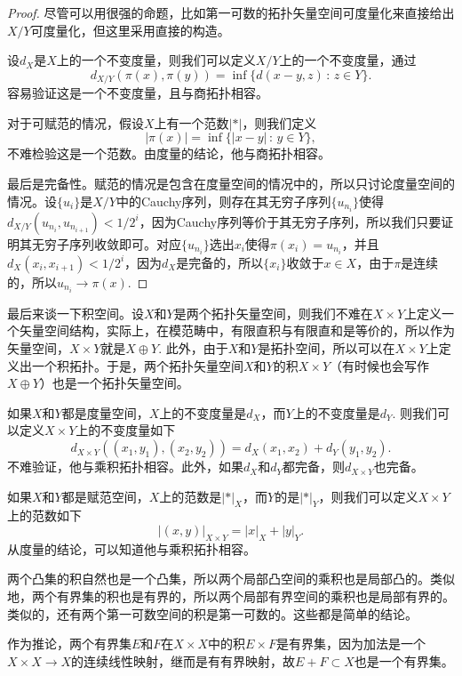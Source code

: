 \begin{proof}
	尽管可以用很强的命题，比如第一可数的拓扑矢量空间可度量化来直接给出$X/Y$可度量化，但这里采用直接的构造。

	设$d_X$是$X$上的一个不变度量，则我们可以定义$X/Y$上的一个不变度量，通过
	\[
	d_{X/Y}(\pi(x),\pi(y))=\inf\{d(x-y,z)\,:\, z\in Y\}.
	\]
	容易验证这是一个不变度量，且与商拓扑相容。

	对于可赋范的情况，假设$X$上有一个范数$|*|$，则我们定义
	\[
	|\pi(x)|=\inf\{|x-y|\,:\,y\in Y\},
	\]
	不难检验这是一个范数。由度量的结论，他与商拓扑相容。

	最后是完备性。赋范的情况是包含在度量空间的情况中的，所以只讨论度量空间的情况。设$\{u_i\}$是$X/Y$中的Cauchy序列，则存在其无穷子序列$\{u_{n_i}\}$使得$d_{X/Y}(u_{n_i},u_{n_{i+1}})<1/2^i$，因为Cauchy序列等价于其无穷子序列，所以我们只要证明其无穷子序列收敛即可。对应$\{u_{n_i}\}$选出$x_i$使得$\pi(x_i)=u_{n_i}$，并且$d_X(x_i,x_{i+1})<1/2^i$，因为$d_X$是完备的，所以$\{x_i\}$收敛于$x\in X$，由于$\pi$是连续的，所以$u_{n_i}\to \pi(x)$.
\end{proof}

\begin{para}
	最后来谈一下积空间。设$X$和$Y$是两个拓扑矢量空间，则我们不难在$X\times Y$上定义一个矢量空间结构，实际上，在模范畴中，有限直积与有限直和是等价的，所以作为矢量空间，$X\times Y$就是$X\oplus Y$. 此外，由于$X$和$Y$是拓扑空间，所以可以在$X\times Y$上定义出一个积拓扑。于是，两个拓扑矢量空间$X$和$Y$的积$X\times Y$（有时候也会写作$X\oplus Y$）也是一个拓扑矢量空间。

	如果$X$和$Y$都是度量空间，$X$上的不变度量是$d_X$，而$Y$上的不变度量是$d_Y$. 则我们可以定义$X\times Y$上的不变度量如下
	\[
	d_{X\times Y}\left((x_1,y_1),(x_2,y_2)\right)=d_X(x_1,x_2)+d_Y(y_1,y_2).
	\]
	不难验证，他与乘积拓扑相容。此外，如果$d_X$和$d_Y$都完备，则$d_{X\times Y}$也完备。

	如果$X$和$Y$都是赋范空间，$X$上的范数是$|*|_X$，而$Y$的是$|*|_Y$，则我们可以定义$X\times Y$上的范数如下
	\[
	|(x,y)|_{X\times Y}=|x|_X+|y|_Y.
	\]
	从度量的结论，可以知道他与乘积拓扑相容。

	两个凸集的积自然也是一个凸集，所以两个局部凸空间的乘积也是局部凸的。类似地，两个有界集的积也是有界的，所以两个局部有界空间的乘积也是局部有界的。类似的，还有两个第一可数空间的积是第一可数的。这些都是简单的结论。

	作为推论，两个有界集$E$和$F$在$X\times X$中的积$E\times F$是有界集，因为加法是一个$X\times X\to X$的连续线性映射，继而是有有界映射，故$E+F\subset X$也是一个有界集。
\end{para}

